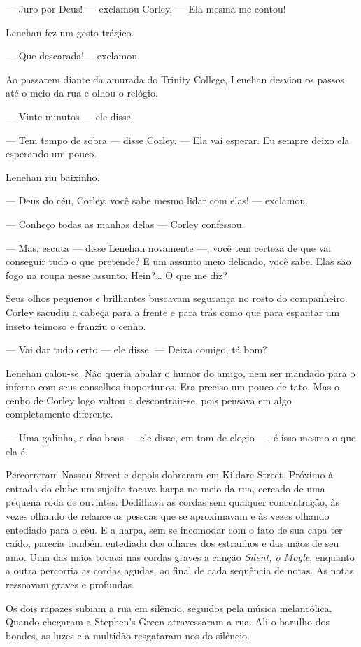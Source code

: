 --- Juro por Deus! --- exclamou Corley. --- Ela mesma me contou!

Lenehan fez um gesto trágico.

--- Que descarada!--- exclamou.

Ao passarem diante da amurada do Trinity College, Lenehan desviou os
passos até o meio da rua e olhou o relógio.

--- Vinte minutos --- ele disse.

--- Tem tempo de sobra --- disse Corley. --- Ela vai esperar. Eu
sempre deixo ela esperando um pouco.

Lenehan riu baixinho.

--- Deus do céu, Corley, você sabe mesmo lidar com elas! ---
exclamou.

--- Conheço todas as manhas delas --- Corley confessou.

--- Mas, escuta --- disse Lenehan novamente ---, você tem certeza
de que vai conseguir tudo o que pretende? E um assunto meio delicado,
você sabe. Elas são fogo na roupa nesse assunto. Hein?\ldots{} O que me
diz?

Seus olhos pequenos e brilhantes buscavam segurança no
rosto do companheiro. Corley sacudiu a cabeça para a frente e
para trás como que para espantar um inseto teimoso e franziu o
cenho.

--- Vai dar tudo certo --- ele disse. --- Deixa comigo, tá bom?

Lenehan calou-se. Não queria abalar o humor do amigo, nem ser mandado
para o inferno com seus conselhos inoportunos. Era preciso um pouco de
tato. Mas o cenho de Corley logo voltou a descontrair-se, pois pensava
em algo completamente diferente.

--- Uma galinha, e das boas --- ele disse, em tom de elogio ---, é
isso mesmo o que ela é.

Percorreram Nassau Street e depois dobraram em Kildare Street. Próximo
à entrada do clube um sujeito tocava harpa no meio da rua, cercado de
uma pequena roda de ouvintes. Dedilhava as cordas sem qualquer
concentração, às vezes olhando de relance as pessoas que se
aproximavam e às vezes olhando entediado para o céu. E a harpa, sem
se incomodar com o fato de sua capa ter caído, parecia também
entediada dos olhares dos estranhos e das mãos de seu amo. Uma das
mãos tocava nas cordas graves a canção \textit{Silent, o Moyle}, enquanto a
outra percorria as cordas agudas, ao final de cada sequência de notas.
As notas ressoavam graves e profundas.

Os dois rapazes subiam a rua em silêncio, seguidos pela música
melancólica. Quando chegaram a Stephen's Green atravessaram a rua.
Ali o barulho dos bondes, as luzes e a multidão resgataram-nos do
silêncio.

